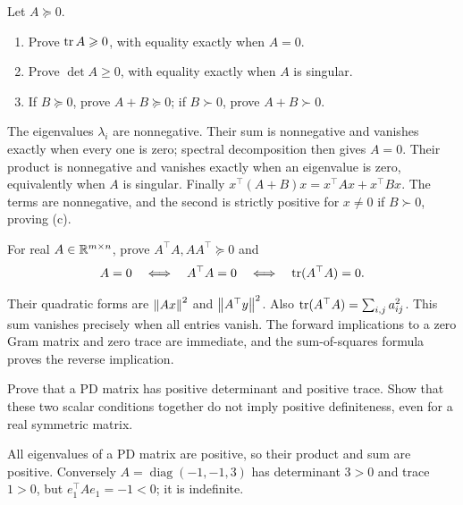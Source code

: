 \begin{problem}\label{ex:09:psd-sums}
Let \(A\succeq0\).
\begin{enumerate}
\item Prove \(\operatorname{tr} A\geqslant0\), with equality exactly when \(A=0\).
\item Prove \(\det A\geqslant0\), with equality exactly when \(A\) is singular.
\item If \(B\succeq0\), prove \(A+B\succeq0\); if \(B\succ0\),
prove \(A+B\succ0\).
\end{enumerate}
\end{problem}
\begin{solution}
The eigenvalues \(\lambda_i\) are nonnegative. Their sum is nonnegative
and vanishes exactly when every one is zero; spectral decomposition
then gives \(A=0\).
Their product is nonnegative and vanishes exactly when an eigenvalue is
zero, equivalently when \(A\) is singular.
Finally \(x^\top(A+B)x=x^\top Ax+x^\top Bx\).
The terms are nonnegative, and the second is strictly positive for
\(x\ne0\) if \(B\succ0\), proving (c).
\end{solution}

\begin{problem}\label{ex:09:zero-gram}
For real \(A\in\mathbb R^{m\times n}\), prove \(A^\top A,AA^\top\succeq0\) and
\[
 A=0\quad\Longleftrightarrow\quad A^\top A=0
 \quad\Longleftrightarrow\quad\operatorname{tr}(A^\top A)=0.
\]
\end{problem}
\begin{solution}
Their quadratic forms are \(\left\lVert Ax\right\rVert^2\) and \(\left\lVert A^\top y\right\rVert^2\).
Also
\(\operatorname{tr}(A^\top A)=\sum_{i,j}a_{ij}^2\).
This sum vanishes precisely when all entries vanish.
The forward implications to a zero Gram matrix and zero trace are
immediate, and the sum-of-squares formula proves the reverse implication.
\end{solution}

\begin{problem}\label{ex:09:det-trace}
Prove that a PD matrix has positive determinant and positive trace.
Show that these two scalar conditions together do not imply positive
definiteness, even for a real symmetric matrix.
\end{problem}
\begin{solution}
All eigenvalues of a PD matrix are positive, so their product and sum
are positive. Conversely
\(A=\operatorname{diag}(-1,-1,3)\) has determinant \(3>0\) and
trace \(1>0\), but \(e_1^\top Ae_1=-1<0\); it is indefinite.
\end{solution}

